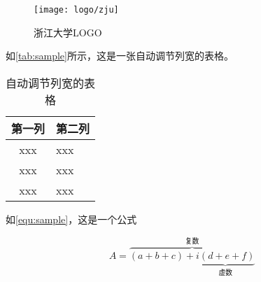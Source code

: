 \begin{figure}[!h]
    \centering
    \texttt{[image: logo/zju]}
    \caption{\label{fig:zju-logo}浙江大学LOGO}
\end{figure}

\par 如\autoref{tab:sample}所示，这是一张自动调节列宽的表格。

\begin{table}[!h]
    \caption{\label{tab:sample}自动调节列宽的表格}
    \begin{tabularx}{\linewidth}{c|X<{\centering}}
        \hline
        第一列 & 第二列 \\ \hline
        xxx & xxx \\ \hline
        xxx & xxx \\ \hline
        xxx & xxx \\ \hline
    \end{tabularx}
\end{table}

\par 如\autoref{equ:sample}，这是一个公式

\begin{equation}
    \label{equ:sample}
    A=\overbrace{(a+b+c)+\underbrace{i(d+e+f)}_{\text{虚数}}}^{\text{复数}}
\end{equation}
